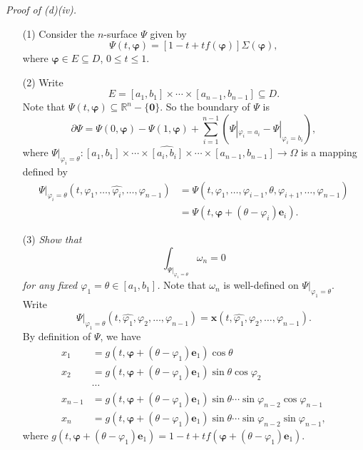 \documentclass{article}
\begin{document}
\emph{Proof of (d)(iv).}
\begin{enumerate}
\item[(1)]
  Consider the $n$-surface $\Psi$ given by
  \[
    \Psi(t,\bm{\varphi}) = [1-t+tf(\bm{\varphi})]\Sigma(\bm{\varphi}),
  \]
  where $\bm{\varphi} \in E \subseteq D$, $0 \leq t \leq 1$.

\item[(2)]
  Write
  \[
    E = [a_1,b_1] \times \cdots \times [a_{n-1},b_{n-1}] \subseteq D.
  \]
  Note that $\Psi(t,\bm{\varphi}) \subseteq \mathbb{R}^n - \{ \mathbf{0} \}$.
  So the boundary of $\Psi$ is
  \[
    \partial \Psi
    = \Psi(0,\bm{\varphi}) - \Psi(1,\bm{\varphi})
      + \sum_{i=1}^{n-1} ( \Psi|_{\varphi_i=a_i} - \Psi|_{\varphi_i=b_i}),
  \]
  where $\Psi|_{\varphi_i=\theta}:
  [a_1,b_1] \times \cdots \times \widehat{[a_i,b_i]} \times \cdots \times [a_{n-1},b_{n-1}]
  \to \Omega$ is a mapping defined by
  \begin{align*}
   \Psi|_{\varphi_i=\theta}(t,\varphi_1,\ldots,\widehat{\varphi_i},\ldots,\varphi_{n-1})
    &= \Psi(t,\varphi_1,\ldots,\varphi_{i-1},\theta,\varphi_{i+1},\ldots,\varphi_{n-1}) \\
    &= \Psi(t,\bm{\varphi} + (\theta-\varphi_i)\mathbf{e}_i).
  \end{align*}

\item[(3)]
  \emph{Show that
  \[
    \int_{\Psi|_{\varphi_1=\theta}} \omega_n = 0
  \]
  for any fixed $\varphi_1 = \theta \in [a_1, b_1]$.}
  Note that $\omega_n$ is well-defined on $\Psi|_{\varphi_1=\theta}$. \\
  Write
  \[
    \Psi|_{\varphi_1=\theta}(t,\widehat{\varphi_1},\varphi_2,\ldots,\varphi_{n-1})
    = \mathbf{x}(t,\widehat{\varphi_1},\varphi_2,\ldots,\varphi_{n-1}).
  \]
  By definition of $\Psi$, we have
  \begin{align*}
    x_1 &= g(t,\bm{\varphi} + (\theta-\varphi_1)\mathbf{e}_1)
      \cos\theta \\
    x_2 &= g(t,\bm{\varphi} + (\theta-\varphi_1)\mathbf{e}_1)
      \sin\theta \cos\varphi_2 \\
    & \cdots \\
    x_{n-1} &= g(t,\bm{\varphi} + (\theta-\varphi_1)\mathbf{e}_1)
      \sin\theta \cdots \sin\varphi_{n-2} \cos\varphi_{n-1} \\
    x_n &= g(t,\bm{\varphi} + (\theta-\varphi_1)\mathbf{e}_1)
      \sin\theta \cdots \sin\varphi_{n-2} \sin\varphi_{n-1},
  \end{align*}
  where
  $g(t,\bm{\varphi} + (\theta-\varphi_1)\mathbf{e}_1)
  = 1-t+tf(\bm{\varphi} + (\theta-\varphi_1)\mathbf{e}_1)$.


\end{enumerate}
\end{document}
